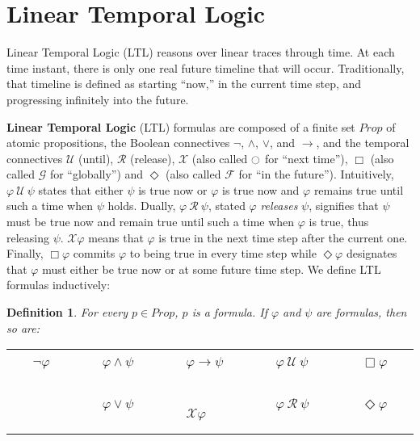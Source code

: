 \documentclass{elsarticle} %
\newtheorem{defin}{Definition}
\renewcommand{\phi}{\varphi}
\begin{document}
\section{Linear Temporal Logic}


Linear Temporal Logic (LTL) reasons over linear traces through time. At each time instant, there is only one real future timeline that will occur. Traditionally, that timeline is defined as starting ``now,'' in the current time step, and progressing infinitely into the future. 


{\bf Linear Temporal Logic} (LTL) formulas are composed of a finite set $Prop$ of atomic propositions, the Boolean connectives $\neg$, $\wedge$, $\vee$, and $\rightarrow$, and the temporal connectives $\mathcal{U}$ (until), $\mathcal{R}$ (release), $\mathcal{X}$ (also called $\ocircle$ for ``next time''), $\Box$ (also called $\mathcal{G}$ for ``globally'') and $\Diamond$ (also called $\mathcal{F}$ for ``in the future''). Intuitively, $\phi \ \mathcal{U} \ \psi$ states that either $\psi$ is true now or $\phi$ is true now and $\phi$ remains true until such a time when $\psi$ holds. Dually, $\phi \ \mathcal{R} \ \psi$, stated $\phi$ \emph{releases} $\psi$, signifies that $\psi$ must be true now and remain true until such a time when $\phi$ is true, thus releasing $\psi$. $\mathcal{X} \phi$ means that $\phi$ is true in the next time step after the current one. Finally, $\Box \phi$ commits $\phi$ to being true in every time step while $\Diamond \phi$ designates that $\phi$ must either be true now or at some future time step. We define LTL formulas inductively:
\begin{defin}\label{LTL_Syntax}
For every $p \in Prop$, $p$ is a formula. If $\phi$ and $\psi$ are formulas, then so are:

\begin{tabular}{lllll}
\ \ \ $\neg \phi$ \ \ \ &
\ \ \ $\phi \wedge \psi$ \ \ \ &
\ \ \ $\phi \rightarrow \psi$ \ \ \ &
\ \ \ $\phi \ \mathcal{U} \ \psi$ \ \ \ &
\ \ \ $\Box \phi$ \ \ \ \\
&
\ \ \ $\phi \vee \psi$ \ \ \ &
\ \ \ $\mathcal{X} \phi$ \ \ \ &
\ \ \ $\phi \ \mathcal{R} \ \psi$ \ \ \ &
\ \ \ $\Diamond \phi$ \ \ \ \\
\end{tabular}
\end{defin}
\noindent
\end{document}
